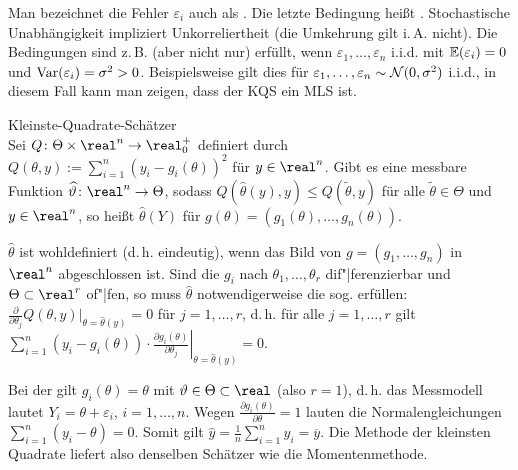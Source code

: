 \begin{Bem}
    Man bezeichnet die Fehler $\varepsilon_i$ auch als .
    Die letzte Bedingung heißt .
    Stochastische Unabhängigkeit impliziert Unkorreliertheit (die Umkehrung gilt i.\,A. nicht).
    Die Bedingungen sind z.\,B. (aber nicht nur) erfüllt, wenn
    $\varepsilon_1, \dotsc, \varepsilon_n$ i.i.d. mit $\mathbb{E}(\varepsilon_i) = 0$ und
    $\mathrm{Var}(\varepsilon_i) = \sigma^2 > 0$.
    Beispielsweise gilt dies für $\varepsilon_1, \dotsc, \varepsilon_n \sim \mathcal{N}(0, \sigma^2)$
    i.i.d., in diesem Fall kann man zeigen, dass der KQS ein MLS ist.
\end{Bem}

\linie

\begin{Def}{Kleinste-Quadrate-Schätzer}\\
    Sei $Q\colon \Theta \times \real^n \rightarrow \real_0^+$ definiert durch
    $Q(\theta, y) := \sum_{i=1}^n (y_i - g_i(\theta))^2$ für $y \in \real^n$.
    Gibt es eine messbare Funktion $\widehat{\theta}\colon \real^n \rightarrow \Theta$,
    sodass $Q(\widehat{\theta}(y), y) \le Q(\widetilde{\theta}, y)$ für alle
    $\widetilde{\theta} \in \Theta$ und $y \in \real^n$,
    so heißt $\widehat{\theta}(Y)$   für
    $g(\theta) = (g_1(\theta), \dotsc, g_n(\theta))$.
\end{Def}

\begin{Bem}
    $\widehat{\theta}$ ist wohldefiniert (d.\,h. eindeutig),
    wenn das Bild von $g = (g_1, \dotsc, g_n)$ in $\real^n$ abgeschlossen ist.
    Sind die $g_i$ nach $\theta_1, \dotsc, \theta_r$ dif"|ferenzierbar und $\Theta \subset \real^r$
    of"|fen, so muss $\widehat{\theta}$ notwendigerweise die sog.
     erfüllen:
    $\frac{\partial}{\partial \theta_j} Q(\theta, y)|_{\theta=\widehat{\theta}(y)} = 0$ für
    $j = 1, \dotsc, r$, d.\,h. für alle $j = 1, \dotsc, r$ gilt
    $\sum_{i=1}^n (y_i - g_i(\theta)) \cdot
    \left.\frac{\partial g_i(\theta)}{\partial \theta_j}\right|_{\theta=\widehat{\theta}(y)} = 0$.
\end{Bem}

\linie
\pagebreak

\begin{Bsp}
    Bei der  gilt $g_i(\theta) = \theta$ mit
    $\theta \in \Theta \subset \real$ (also $r = 1$), d.\,h. das Messmodell lautet
    $Y_i = \theta + \varepsilon_i$, $i = 1, \dotsc, n$.
    Wegen $\frac{\partial g_i(\theta)}{\partial \theta} = 1$ lauten die Normalengleichungen
    $\sum_{i=1}^n (y_i - \theta) = 0$.
    Somit gilt $\widehat{y} = \frac{1}{n} \sum_{i=1}^n y_i = \overline{y}$.
    Die Methode der kleinsten Quadrate liefert also denselben Schätzer wie die Momentenmethode.
\end{Bsp}


